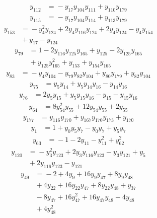 \begin{align*}
y_{112} &={} -y_{17}y_{104}y_{111} +y_{110}y_{179}
\end{align*}
\begin{align*}
y_{115} &={} -y_{17}y_{104}y_{114} +y_{113}y_{179}
\end{align*}
\begin{align*}
y_{153} &={} -y_{4}^{2}y_{124} +2y_{4}y_{116}y_{124} +2y_{4}y_{124} -y_{4}y_{154} \\
 &{} +y_{17} -y_{124}
\end{align*}
\begin{align*}
y_{79} &={} 1 -2y_{116}y_{125}y_{165} +y_{125} -2y_{125}y_{165} \\
 &{} +y_{125}y_{165}^{2} +y_{153} +y_{154}y_{165}
\end{align*}
\begin{align*}
y_{83} &={} -y_{4}y_{104} -y_{79}y_{82}y_{104} +y_{80}y_{179} +y_{82}y_{104}
\end{align*}
\begin{align*}
y_{75} &={} y_{5}y_{14} +y_{5}y_{14}y_{16} -y_{14}y_{16}
\end{align*}
\begin{align*}
y_{76} &={} 2y_{5}y_{15} +y_{5}y_{15}y_{16} -y_{15} -y_{15}y_{16}
\end{align*}
\begin{align*}
y_{64} &={} 8y_{54}^{2}y_{55} +12y_{54}y_{55} +2y_{55}
\end{align*}
\begin{align*}
y_{177} &={} y_{116}y_{170} +y_{167}y_{170}y_{173} +y_{170}
\end{align*}
\begin{align*}
y_{1} &={} 1 +y_{0}y_{5}y_{7} -y_{0}y_{7} +y_{5}y_{7}
\end{align*}
\begin{align*}
y_{63} &={} -1 -2y_{11} -y_{11}^{2} +y_{62}^{2}
\end{align*}
\begin{align*}
y_{120} &={} -y_{3}^{2}y_{123} +2y_{3}y_{116}y_{123} -y_{3}y_{121} +y_{5} \\
 &{} +2y_{116}y_{123} -y_{121}
\end{align*}
\begin{align*}
y_{49} &={} -2 +4y_{9} +16y_{9}y_{47} +8y_{9}y_{48} \\
 &{} +4y_{22} +16y_{22}y_{47} +8y_{22}y_{48} +y_{37} \\
 &{} -8y_{47} +16y_{47}^{2} +16y_{47}y_{48} -4y_{48} \\
 &{} +4y_{48}^{2}
\end{align*}
